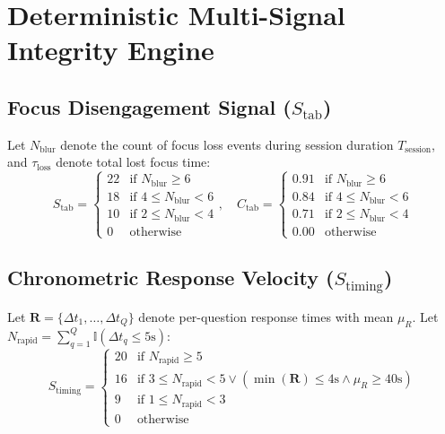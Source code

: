 \documentclass[journal]{IEEEtran}
\begin{document}
\section{Deterministic Multi-Signal Integrity Engine}

\subsection{Focus Disengagement Signal ($S_{\text{tab}}$)}
Let $N_{\text{blur}}$ denote the count of focus loss events during session duration $T_{\text{session}}$, and $\tau_{\text{loss}}$ denote total lost focus time:
\begin{equation}
S_{\text{tab}} = \begin{cases} 
22 & \text{if } N_{\text{blur}} \ge 6 \\
18 & \text{if } 4 \le N_{\text{blur}} < 6 \\
10 & \text{if } 2 \le N_{\text{blur}} < 4 \\
0 & \text{otherwise}
\end{cases}, \quad
C_{\text{tab}} = \begin{cases}
0.91 & \text{if } N_{\text{blur}} \ge 6 \\
0.84 & \text{if } 4 \le N_{\text{blur}} < 6 \\
0.71 & \text{if } 2 \le N_{\text{blur}} < 4 \\
0.00 & \text{otherwise}
\end{cases}
\end{equation}

\subsection{Chronometric Response Velocity ($S_{\text{timing}}$)}
Let $\mathbf{R} = \{\Delta t_1, \dots, \Delta t_Q\}$ denote per-question response times with mean $\mu_R$. Let $N_{\text{rapid}} = \sum_{q=1}^Q \mathbb{I}(\Delta t_q \le 5\text{s})$:
\begin{equation}
S_{\text{timing}} = \begin{cases}
20 & \text{if } N_{\text{rapid}} \ge 5 \\
16 & \text{if } 3 \le N_{\text{rapid}} < 5 \lor (\min(\mathbf{R}) \le 4\text{s} \land \mu_R \ge 40\text{s}) \\
9  & \text{if } 1 \le N_{\text{rapid}} < 3 \\
0  & \text{otherwise}
\end{cases}
\end{equation}
\end{document}
